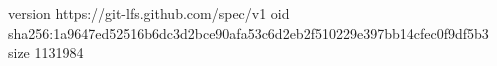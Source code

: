 version https://git-lfs.github.com/spec/v1
oid sha256:1a9647ed52516b6dc3d2bce90afa53c6d2eb2f510229e397bb14cfec0f9df5b3
size 1131984
